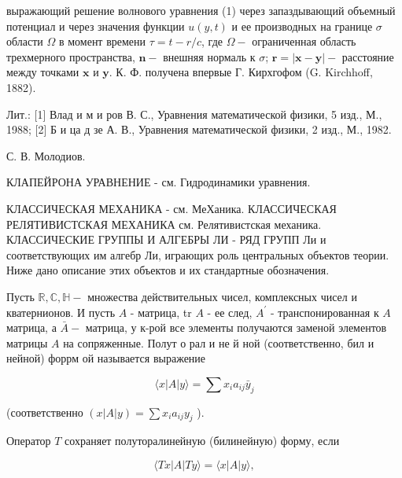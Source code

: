 \documentclass[10pt]{article}
\begin{document}
выражающий решение волнового уравнения (1) через запаздывающий объемный потенциал и через значения функции $u(y, t)$ и ее производных на границе $\sigma$ области $\Omega$ в момент времени $\tau=t-r / c$, где $\Omega-$ ограниченная область трехмерного пространства, $\boldsymbol{n}-$ внешняя нормаль к $\sigma$; $\boldsymbol{r}=|\boldsymbol{x}-\boldsymbol{y}|-$ расстояние между точками $\boldsymbol{x}$ и $\boldsymbol{y}$. К. Ф. получена впервые Г. Кирхгофом (G. Kirchhoff, 1882).



Лит.: [1] Влад и м и ров В. С., Уравнения математической физики, 5 изд., М., 1988; [2] Б и ца д зе А. В., Уравнения математической физики, 2 изд., М., 1982.



С. В. Молодиов.



КЛАПЕЙРОНА УРАВНЕНИЕ - см. Гидродинамики уравнения.



КЛАССИЧЕСКАЯ МЕХАНИКА - см. МеХаника. КЛАССИЧЕСКАЯ РЕЛЯТИВИСТСКАЯ МЕХАНИКА см. Релятивистская механика. КЛАССИЧЕСКИЕ ГРУППЫ И АЛГЕБРЫ ЛИ - РЯД ГРУПП Ли и соответствующих им алгебр Ли, играющих роль центральных объектов теории. Ниже дано описание этих объектов и их стандартные обозначения.



Пусть $\mathbb{R}, \mathbb{C}, \mathbb{H}-$ множества действительных чисел, комплексных чисел и кватернионов. И пусть $A$ - матрица, tr $A$ - ее след, $A^{\prime}$ - транспонированная к $A$ матрица, а $\bar{A}-$ матрица, у к-рой все элементы получаются заменой элементов матрицы $A$ на сопряженные. Полут о рал и не й ной (соответственно, бил и нейной) форрм ой называется выражение



\[

\langle x|A| y\rangle=\sum x_{i} a_{i j} \bar{y}_{j}

\]



(соответственно $(x|A| y)=\sum x_{i} a_{i j} y_{j}$ ).



Оператор $T$ сохраняет полуторалинейную (билинейную) форму, если



\[

\langle T x|A| T y\rangle=\langle x|A| y\rangle,

\]
\end{document}
